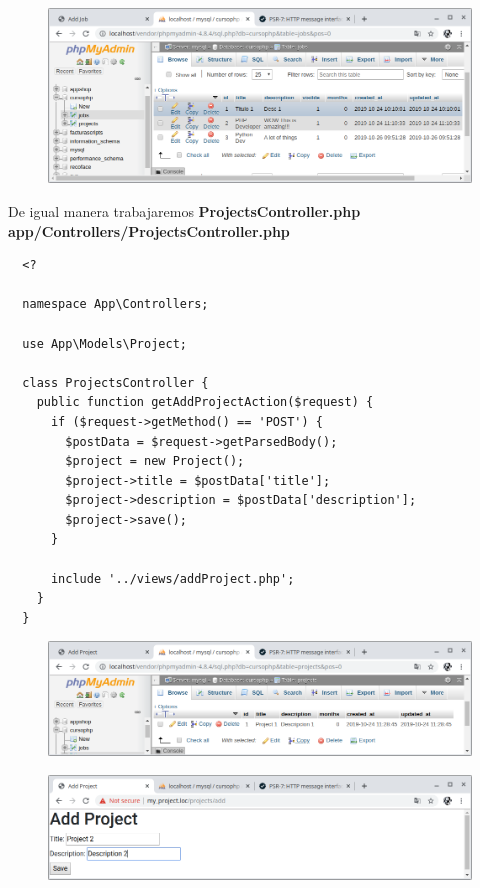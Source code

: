 \documentclass{article}
\begin{document}
\begin{figure}[h!]
  \centering
  \includegraphics[scale=0.5]{./Pictures/147_datos_alamacenados_bd.png}
\end{figure}

De igual manera trabajaremos \textbf{ProjectsController.php}\\

\textbf{app/Controllers/ProjectsController.php}
\begin{verbatim}
  <?

  namespace App\Controllers;

  use App\Models\Project;

  class ProjectsController {
    public function getAddProjectAction($request) {
      if ($request->getMethod() == 'POST') {
        $postData = $request->getParsedBody();
        $project = new Project();
        $project->title = $postData['title'];
        $project->description = $postData['description'];
        $project->save();
      }

      include '../views/addProject.php';
    }
  }
\end{verbatim}

\begin{figure}[h!]
  \centering
  \includegraphics[scale=0.5]{./Pictures/147_bd_projects_actual.png}
\end{figure}

\begin{figure}[h!]
  \centering
  \includegraphics[scale=0.5]{./Pictures/148_datos_guardar_projects.png}
\end{figure}
\end{document}
